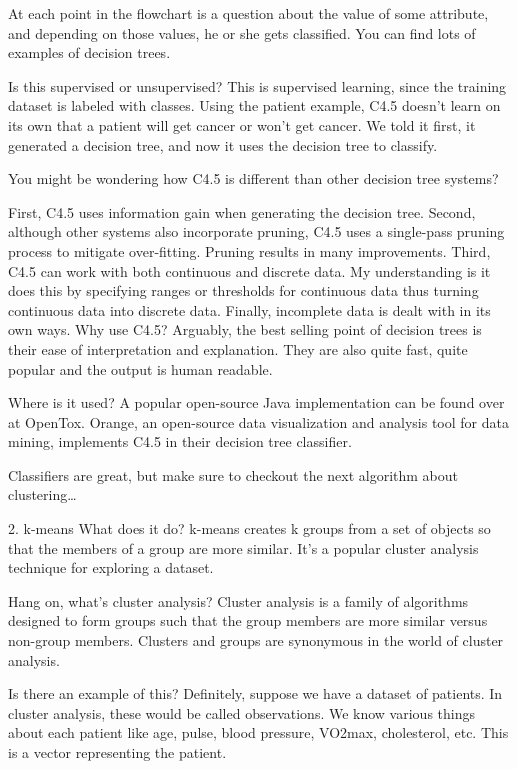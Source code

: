 At each point in the flowchart is a question about the value of some attribute, and depending on those values, he or she gets classified. You can find lots of examples of decision trees.

Is this supervised or unsupervised? This is supervised learning, since the training dataset is labeled with classes. Using the patient example, C4.5 doesn’t learn on its own that a patient will get cancer or won’t get cancer. We told it first, it generated a decision tree, and now it uses the decision tree to classify.

You might be wondering how C4.5 is different than other decision tree systems?

First, C4.5 uses information gain when generating the decision tree.
Second, although other systems also incorporate pruning, C4.5 uses a single-pass pruning process to mitigate over-fitting. Pruning results in many improvements.
Third, C4.5 can work with both continuous and discrete data. My understanding is it does this by specifying ranges or thresholds for continuous data thus turning continuous data into discrete data.
Finally, incomplete data is dealt with in its own ways.
Why use C4.5? Arguably, the best selling point of decision trees is their ease of interpretation and explanation. They are also quite fast, quite popular and the output is human readable.

Where is it used? A popular open-source Java implementation can be found over at OpenTox. Orange, an open-source data visualization and analysis tool for data mining, implements C4.5 in their decision tree classifier.

Classifiers are great, but make sure to checkout the next algorithm about clustering…

2. k-means
What does it do? k-means creates k groups from a set of objects so that the members of a group are more similar. It’s a popular cluster analysis technique for exploring a dataset.

Hang on, what’s cluster analysis? Cluster analysis is a family of algorithms designed to form groups such that the group members are more similar versus non-group members. Clusters and groups are synonymous in the world of cluster analysis.

Is there an example of this? Definitely, suppose we have a dataset of patients. In cluster analysis, these would be called observations. We know various things about each patient like age, pulse, blood pressure, VO2max, cholesterol, etc. This is a vector representing the patient.

